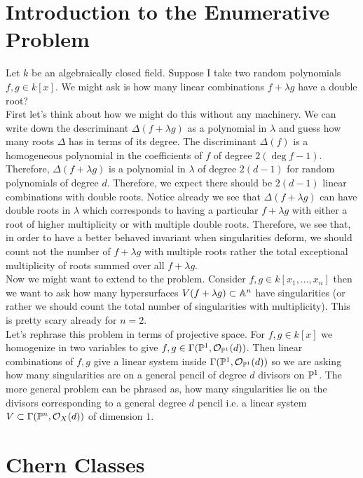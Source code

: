 \documentclass[12pt]{article}
\begin{document}
\section{Introduction to the Enumerative Problem}

Let $k$ be an algebraically closed field. Suppose I take two random polynomials $f, g \in k[x]$. We might ask is how many linear combinations $f + \lambda g$ have a double root? 
\bigskip\\
First let's think about how we might do this without any machinery. We can write down the descriminant $\Delta(f + \lambda g)$ as a polynomial in $\lambda$ and guess how many roots $\Delta$ has in terms of its degree. The discriminant $\Delta(f)$ is a homogeneous polynomial in the coefficients of $f$ of degree $2(\deg{f} - 1)$. Therefore, $\Delta(f + \lambda g)$ is a polynomial in $\lambda$ of degree $2(d - 1)$ for random polynomials of degree $d$. Therefore, we expect there should be $2(d - 1)$ linear combinations with double roots. Notice already we see that $\Delta(f + \lambda g)$ can have double roots in $\lambda$ which corresponds to having a particular $f + \lambda g$ with either a root of higher multiplicity or with multiple double roots. Therefore, we see that, in order to have a better behaved invariant when singularities deform, we should count not the number of $f + \lambda g$ with multiple roots rather the total exceptional multiplicity of roots summed over all $f + \lambda g$.
\bigskip\\
Now we might want to extend to the problem. Consider $f,g \in k[x_1, \dots, x_n]$ then we want to ask how many hypersurfaces $V(f + \lambda g) \subset \A^n$ have singularities (or rather we should count the total number of singularities with multiplicity). This is pretty scary already for $n = 2$.
\bigskip\\
Let's rephrase this problem in terms of projective space. For $f,g \in k[x]$ we homogenize in two variables to give $f,g \in \Gamma(\P^1, \struct{\P^1}(d))$. Then linear combinations of $f, g$ give a linear system inside $\Gamma(\P^1, \struct{\P^1}(d))$ so we are asking how many singularities are on a general pencil of degree $d$ divisors on $\P^1$. The more general problem can be phrased as, how many singularities lie on the divisors corresponding to a general degree $d$ pencil i.e. a linear system $V \subset \Gamma(\P^n, \struct{X}(d))$ of dimension $1$.

\section{Chern Classes}
\end{document}
